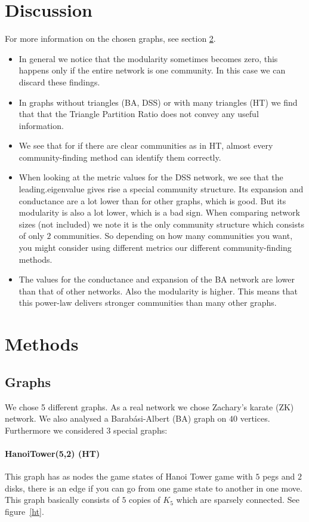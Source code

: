 \documentclass[paper=a4, fontsize=11pt]{scrartcl} %
\begin{document}
\section{Discussion}
For more information on the chosen graphs, see section \ref{meth}. 
\begin{itemize}
\item In general we notice that the modularity sometimes becomes zero, this happens only if the entire network is one community. In this case we can discard these findings.
\item In graphs without triangles (BA, DSS) or with many triangles (HT) we find that that the Triangle Partition Ratio does not convey any useful information.
\item We see that for if there are clear communities as in HT, almost every community-finding method can identify them correctly.
\item When looking at the metric values for the DSS network, we see that the leading.eigenvalue gives rise a special community structure. Its expansion and conductance are a lot lower than for other graphs, which is good. But its modularity is also a lot lower, which is a bad sign. When comparing network sizes (not included) we note it is the only community structure which consists of only $2$ communities. So depending on how many communities you want, you might consider using different metrics our different community-finding methods.
\item The values for the conductance and expansion of the BA network are lower than that of other networks. Also the modularity is higher. This means that this power-law delivers stronger communities than many other graphs.
\end{itemize}


\section{Methods}\label{meth}
\subsection{Graphs}
We chose 5 different graphs. As a real network we chose Zachary's karate (ZK) network. We also analysed a Barab\'{a}si-Albert (BA) graph on $40$ vertices.
Furthermore we considered $3$ special graphs:
\paragraph{HanoiTower(5,2) (HT)}
This graph has as nodes the game states of Hanoi Tower game with $5$ pegs and $2$ disks, there is an edge if you can go from one game state to another in one move. This graph basically consists of $5$ copies of $K_{5}$ which are sparsely connected. See figure~\ref{ht}.
\end{document}
